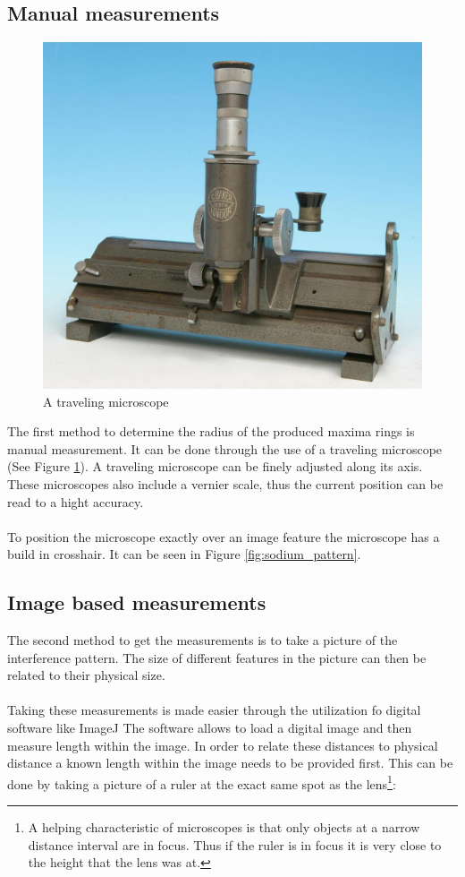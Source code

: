 \documentclass[12pt]{article}
\begin{document}
\subsection{Manual measurements}

\begin{figure}[H]
  \centering
  \includegraphics[width=12cm]{./images/traveling_microscope.png}
  \caption{A traveling microscope\autocite{leeds}}
  \label{fig:traveling_microscope}
\end{figure}


The first method to determine the radius of the produced maxima rings is manual measurement.
It can be done through the use of a traveling microscope (See Figure \ref{fig:traveling_microscope}).
A traveling microscope can be finely
adjusted along its axis. These microscopes also include a vernier scale, thus the current
position can be read to a hight accuracy. \\
\\
To position the microscope exactly over an image feature the microscope has a build in crosshair. 
It can be seen in Figure \ref*{fig:sodium_pattern}.

\subsection{Image based measurements}

The second method to get the measurements is to take a picture of the interference pattern. The size of
different features in the picture can then be related to their physical size.\\
\\
Taking these measurements is made easier through the utilization fo digital software like ImageJ\autocite{ImageJ}
The software allows to load a digital image and then measure length within the image. In order to
relate these distances to physical distance a known length within the image needs to be provided first.
This can be done by taking a picture of a ruler at the exact same spot as the lens\footnote{A helping characteristic
of microscopes is that only objects at a narrow distance interval are in focus. Thus if the ruler is in focus it is 
very close to the height that the lens was at.}:
\end{document}
